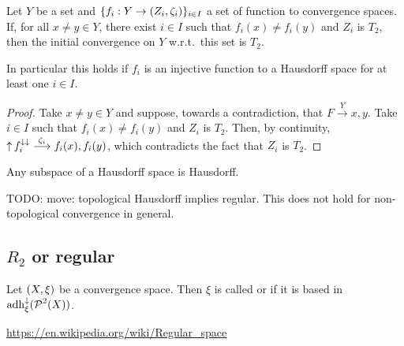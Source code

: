 \begin{lemma} \label{T2initialConvergence}
Let $Y$ be a set and $\{f_i: Y\to \left( Z_i, \zeta_i \right)\}_{i\in I}$ a set of function to convergence spaces. If, for all $x \neq y\in Y$, there exist $i\in I$ such that $f_i(x) \neq f_i(y)$ and $Z_i$ is $T_2$, then the initial convergence on $Y$ w.r.t.\ this set is $T_2$.
\end{lemma}
In particular this holds if $f_i$ is an injective function to a Hausdorff space for at least one $i\in I$.
\begin{proof}
Take $x\neq y\in Y$ and suppose, towards a contradiction, that $F\overset{Y}{\longrightarrow} x,y$. Take $i\in I$ such that $f_i(x) \neq f_i(y)$ and $Z_i$ is $T_2$. Then, by continuity, $\operatorname{\uparrow} f_i^{\downarrow\downarrow} \overset{\zeta_i}{\longrightarrow} f_i(x), f_i(y)$, which contradicts the fact that $Z_i$ is $T_2$.
\end{proof}
\begin{corollary} \label{HausdorffSubspace}
Any subspace of a Hausdorff space is Hausdorff.
\end{corollary}

\begin{proposition}
TODO: move: topological Hausdorff implies regular. This does not hold for non-topological convergence in general.
\end{proposition}

\subsection{$R_2$ or regular}
\begin{definition}
Let $\left( X,\xi \right)$ be a convergence space. Then $\xi$ is called  or  if it is based in $\operatorname{adh}_\xi^{\downarrow}(\operatorname{\mathcal{P}}^2(X))$.
\end{definition}

\url{https://en.wikipedia.org/wiki/Regular_space}

